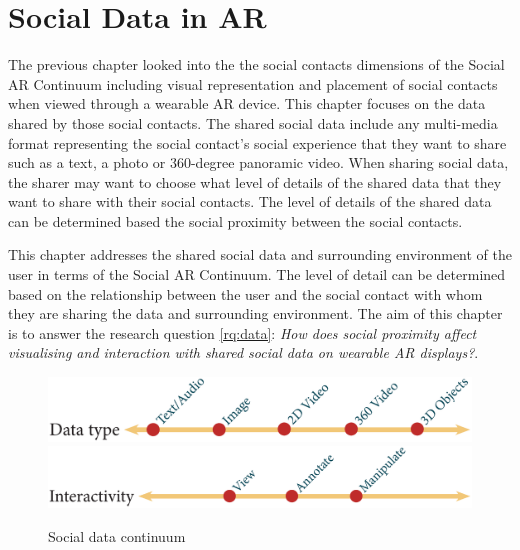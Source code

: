 \chapter{Social Data in AR} 
\label{ch:data} 


The previous chapter looked into the the social contacts dimensions of the Social AR Continuum including visual representation and placement of social contacts when viewed through a wearable AR device. This chapter focuses on the data shared by those social contacts. The shared social data include any multi-media format representing the social contact's social experience that they want to share such as a text, a photo or 360-degree panoramic video. When sharing social data, the sharer may want to choose what level of details of the shared data that they want to share with their social contacts. The level of details of the shared data can be determined based the social proximity between the social contacts. 

This chapter addresses the shared social data and surrounding environment of the user in terms of the Social AR Continuum. The level of detail can be determined based on the relationship between the user and the social contact with whom they are sharing the data and surrounding environment. The aim of this chapter is to answer the research question \ref{rq:data}: \textit{How does social proximity affect visualising and interaction with shared social data on wearable AR displays?}. 


\begin{figure}[h]
  \centering
  \includegraphics[width=\columnwidth]{images/continuum/continuum4.2-03.eps}
  \includegraphics[width=\columnwidth]{images/continuum/continuum4.2-04.eps}
  \caption{Social data continuum}
  \label{fig:surrounding:data-continuum}
\end{figure}

